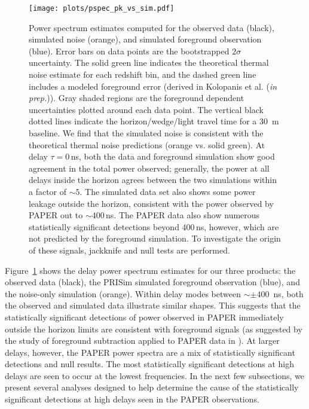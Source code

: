 \begin{figure}[tp]
\centering
\texttt{[image: plots/pspec\_pk\_vs\_sim.pdf]}
\caption{Power spectrum estimates computed for
the observed data (black), simulated noise (orange), and simulated foreground observation (blue).
Error bars on data points are the bootstrapped $2\sigma$ uncertainty.
The solid green line indicates the theoretical thermal
noise estimate for each redshift bin, and the dashed
green line includes a modeled foreground error (derived in Kolopanis et al. (\textit{in prep.})).
Gray shaded regions are the foreground dependent uncertainties plotted around each data point.
The vertical black dotted lines indicate the horizon/wedge/light travel time for a 30~m
baseline. We find that the simulated noise is consistent with
the theoretical thermal noise predictions (orange vs. solid green).
At delay $\tau = 0$\,ns, both the data and foreground simulation
show good agreement in the total power observed;
generally, the power at all delays inside the horizon agrees between the two simulations within a factor of $ \sim5 $. The simulated data set also shows some
power leakage outside the horizon,
consistent with the power observed by PAPER out to $ \sim 400$\,ns. The PAPER data also show numerous statistically significant detections beyond 400\,ns, however, which are not predicted by the foreground simulation.
To investigate the origin of these signals, jackknife and null tests are performed.}
\label{fig:pspec_vs_sim}
\end{figure}

Figure~\ref{fig:pspec_vs_sim} shows the delay power spectrum estimates for our three products: the observed data (black),
the PRISim simulated foreground observation (blue), and the noise-only simulation (orange).
Within delay modes between $ \sim\pm 400 $~ns, both the observed and simulated data illustrate
similar shapes. This suggests that the statistically significant detections of power
observed in PAPER immediately outside the horizon limits
are consistent with foreground signals (as suggested by the study of foreground subtraction applied to PAPER data in \citealt{kerrigan_et_al2018}). At larger delays, however, the PAPER power spectra are a mix of statistically significant detections and null results. The most statistically significant detections at high delays are seen to occur at the lowest frequencies. In the next few subsections, we present several analyses designed to help determine the cause of the statistically significant detections at high delays seen in the PAPER observations.

